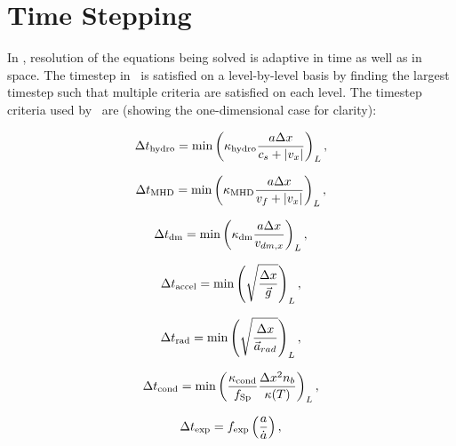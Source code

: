 \section{Time Stepping}
\label{sec.timestepping}

In \enzo, resolution of the equations being solved is adaptive in time 
as well as in space.  The timestep in \enzo\ is satisfied on a level-by-level
 basis by finding the largest timestep such that multiple criteria are
satisfied on each level.  The timestep criteria used by \enzo\ are 
(showing the one-dimensional case for clarity):

\begin{equation}
\Delta t_{\rm hydro} = \min \left( \kappa_{\rm hydro} \frac{a \Delta x}{c_{s} + |v_x|} \right)_L ,
\label{eqn:dthydro}
\end{equation}

\begin{equation}
\Delta t_{\rm MHD} = \min \left( \kappa_{\rm MHD} \frac{a \Delta x}{v_{f} + |v_x|} \right)_L ,
\label{eqn:dtMHD}
\end{equation}

\begin{equation}
\Delta t_{\rm dm} = \min \left(\kappa_{\rm dm} \frac{a \Delta x}{v_{dm,x}} \right)_L ,
\label{eqn:dtdarkmatter}
\end{equation}

\begin{equation}
\Delta t_{\rm accel} = \min \left( \sqrt{\frac{\Delta x}{\vec{g}}} \right)_L ,
\label{eqn:dtaccel}
\end{equation}

\begin{equation}
\Delta t_{\rm rad} = \min \left(  \sqrt{\frac{\Delta x}{\vec{a}_{rad}}} \right)_L,
\label{eqn:dtrad}
\end{equation}

\begin{equation}
\Delta t_{\rm cond} = \min \left(  \frac{ \kappa_{\rm cond}}{f_{\rm Sp}} \frac{\Delta x^2
    n_b}{\kappa(T)} \right)_L,
\label{eqn:dtcond}
\end{equation}

\begin{equation}
\Delta t_{\rm exp} = f_{\rm exp} \left( \frac{a}{\dot{a}} \right) ,
\label{eqn:dtexpand}
\end{equation}


